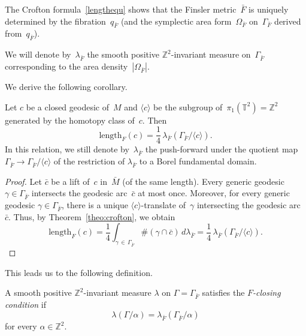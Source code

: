 \documentclass[AHL,Unicode,longabstracts,published]{cedram}
\newcommand{\Z}{\mathbb{Z}}
\newcommand{\T}{\mathbb{T}}
\newcommand{\length}{\mathrm{length}}
\begin{document}
\begin{rema}
The Crofton formula~\eqref{lengthequ} shows that the Finsler metric~$\bar{F}$ is uniquely determined by the fibration~$q_{\bar{F}}$ (and the symplectic area form~$\Omega_{\bar{F}}$ on~$\Gamma_{\bar{F}}$ derived from~$q_{\bar{F}}$).
\end{rema}


\begin{rema}\label{rem:lambda}
We will denote by~$\lambda_{\bar{F}}$ the smooth positive $\Z^2$-invariant measure on~$\Gamma_{\bar{F}}$ corresponding to the area density~$|\Omega_{\bar{F}}|$.
\end{rema}

We derive the following corollary.

\begin{coro}\label{coro:closing}
Let $c$ be a closed geodesic of~$M$ and $\langle c \rangle$ be the subgroup of~$\pi_1(\T^2)=\Z^2$ generated by the homotopy class of~$c$. Then
\[
\length_{F}(c) = \frac{1}{4} \, \lambda_{\bar{F}}(\Gamma_{\bar{F}} / \langle c \rangle).
\]
In this relation, we still denote by~$\lambda_{\bar{F}}$ the push-forward under the quotient map $\Gamma_{\bar{F}} \to \Gamma_{\bar{F}} / \langle c\rangle$ of the restriction of $\lambda_{\bar{F}}$ to a Borel fundamental domain.
\end{coro}

\begin{proof}
Let $\bar{c}$ be a lift of~$c$ in~$\bar{M}$ (of the same length). Every generic geodesic $\gamma \in \Gamma_{\bar{F}}$ intersects the geodesic arc~$\bar{c}$ at most once. Moreover, for every generic geodesic $\gamma \in \Gamma_{\bar{F}}$, there is a unique $\langle c \rangle$-translate of~$\gamma$ intersecting the geodesic arc~$\bar{c}$. Thus, by Theorem~\ref{theo:crofton}, we obtain
\[
\length_{F}(c) = \frac{1}{4} \int_{\gamma\,\in\,\Gamma_{\bar{F}}} \#(\gamma\cap \bar{c})\, d\lambda_{\bar{F}} = \frac{1}{4} \, \lambda_{\bar{F}}(\Gamma_{\bar{F}} / \langle c \rangle).
\]
\end{proof}


This leads us to the following definition.

\begin{defi}\label{def:closing}
A smooth positive $\Z^2$-invariant measure $\lambda$ on $\Gamma=\Gamma_{\bar{F}}$ satisfies the \emph{$F$-closing condition} if
\[
\lambda(\Gamma / \alpha) = \lambda_{\bar{F}}\left(\Gamma_{\bar{F}} / \alpha\right)
\]
for every $\alpha \in \Z^2$.
\end{defi}
\end{document}
